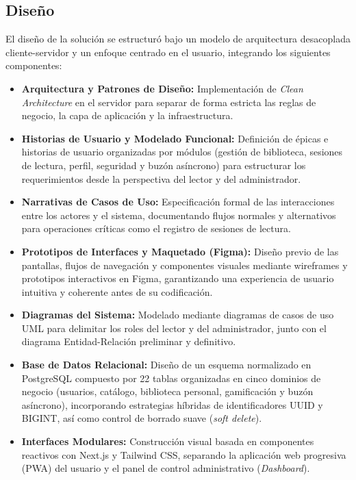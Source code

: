 \documentclass[12pt, atypical, journal]{article}
\begin{document}
\subsection{Diseño}
El diseño de la solución se estructuró bajo un modelo de arquitectura desacoplada cliente-servidor y un enfoque centrado en el usuario, integrando los siguientes componentes:
\begin{itemize}
    \item \textbf{Arquitectura y Patrones de Diseño:} Implementación de \textit{Clean Architecture} en el servidor para separar de forma estricta las reglas de negocio, la capa de aplicación y la infraestructura.
    \item \textbf{Historias de Usuario y Modelado Funcional:} Definición de épicas e historias de usuario organizadas por módulos (gestión de biblioteca, sesiones de lectura, perfil, seguridad y buzón asíncrono) para estructurar los requerimientos desde la perspectiva del lector y del administrador.
    \item \textbf{Narrativas de Casos de Uso:} Especificación formal de las interacciones entre los actores y el sistema, documentando flujos normales y alternativos para operaciones críticas como el registro de sesiones de lectura.
    \item \textbf{Prototipos de Interfaces y Maquetado (Figma):} Diseño previo de las pantallas, flujos de navegación y componentes visuales mediante wireframes y prototipos interactivos en Figma, garantizando una experiencia de usuario intuitiva y coherente antes de su codificación.
    \item \textbf{Diagramas del Sistema:} Modelado mediante diagramas de casos de uso UML para delimitar los roles del lector y del administrador, junto con el diagrama Entidad-Relación preliminar y definitivo.
    \item \textbf{Base de Datos Relacional:} Diseño de un esquema normalizado en PostgreSQL compuesto por 22 tablas organizadas en cinco dominios de negocio (usuarios, catálogo, biblioteca personal, gamificación y buzón asíncrono), incorporando estrategias híbridas de identificadores UUID y BIGINT, así como control de borrado suave (\textit{soft delete}).
    \item \textbf{Interfaces Modulares:} Construcción visual basada en componentes reactivos con Next.js y Tailwind CSS, separando la aplicación web progresiva (PWA) del usuario y el panel de control administrativo (\textit{Dashboard}).
\end{itemize}
\end{document}
